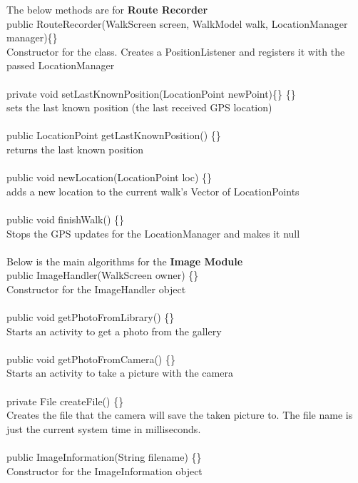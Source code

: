 \documentclass[12pt]{article}
\begin{document}
The below methods are for \textbf{Route Recorder}~\\
public RouteRecorder(WalkScreen screen, WalkModel walk, LocationManager manager)\{\}~\\
Constructor for the class. Creates a PositionListener and registers it with the passed LocationManager~\\\\
private void setLastKnownPosition(LocationPoint newPoint)\{\} \{\}~\\ sets the last known position (the last received GPS location)~\\\\
public LocationPoint getLastKnownPosition() \{\} ~\\
returns the last known position~\\\\
public void newLocation(LocationPoint loc) \{\} ~\\
adds a new location to the current walk's Vector of LocationPoints ~\\\\
public void finishWalk() \{\}~\\
Stops the GPS updates for the LocationManager and makes it null ~\\\\
Below is the main algorithms for the \textbf{Image Module}~\\
public ImageHandler(WalkScreen owner) \{\}~\\
Constructor for the ImageHandler object ~\\\\
public void getPhotoFromLibrary() \{\}~\\
Starts an activity to get a photo from the gallery~\\\\
public void getPhotoFromCamera() \{\}~\\
Starts an activity to take a picture with the camera ~\\\\
private File createFile() \{\} ~\\
Creates the file that the camera will save the taken picture to. The file name is just the current system time in milliseconds. ~\\\\
public ImageInformation(String filename) \{\}~\\
Constructor for the ImageInformation object ~\\\\
\end{document}
